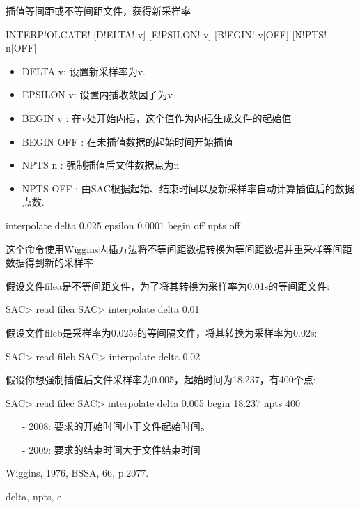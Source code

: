 \label{cmd:interpolate}

插值等间距或不等间距文件，获得新采样率

\begin{SACSTX}
INTERP!OLCATE! [D!ELTA! v] [E!PSILON! v] [B!EGIN! v|OFF] [N!PTS! n|OFF]
\end{SACSTX}

\begin{itemize}
\item DELTA v: 设置新采样率为v.
\item EPSILON v: 设置内插收敛因子为v
\item BEGIN v :  在v处开始内插，这个值作为内插生成文件的起始值 
\item BEGIN OFF : 在未插值数据的起始时间开始插值 
\item NPTS n : 强制插值后文件数据点为n 
\item NPTS OFF : 由SAC根据起始、结束时间以及新采样率自动计算插值后的数据点数. 
\end{itemize}

\begin{SACDFT}
interpolate delta 0.025 epsilon 0.0001 begin off npts off
\end{SACDFT}

这个命令使用Wiggins内插方法将不等间距数据转换为等间距数据并重采样等间距数据得到新的采样率

假设文件filea是不等间距文件，为了将其转换为采样率为0.01s的等间距文件:
\begin{SACCode}
SAC> read filea
SAC> interpolate delta 0.01
\end{SACCode}

假设文件fileb是采样率为0.025s的等间隔文件，将其转换为采样率为0.02s:
\begin{SACCode}
SAC> read fileb
SAC> interpolate delta 0.02
\end{SACCode}

假设你想强制插值后文件采样率为0.005，起始时间为18.237，有400个点:
\begin{SACCode}
SAC> read filec
SAC> interpolate delta 0.005 begin 18.237 npts 400
\end{SACCode}

\begin{itemize}
\item[-]2008: 要求的开始时间小于文件起始时间。
\item[-]2009: 要求的结束时间大于文件结束时间
\end{itemize}

Wiggins, 1976, BSSA, 66, p.2077.

delta, npts, e
